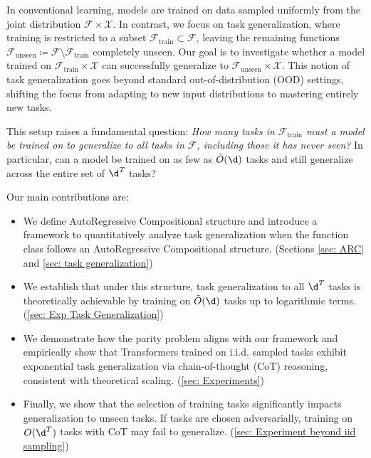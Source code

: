 In conventional learning, models are trained on data sampled uniformly from the joint distribution \(\mathcal{F} \times \mathcal{X}\). In contrast, we focus on task generalization, where training is restricted to a subset \(\mathcal{F}_{\mathrm{train}} \subset \mathcal{F}\), leaving the remaining functions \(\mathcal{F}_{\mathrm{unseen}} \coloneqq \mathcal{F} \setminus \mathcal{F}_{\mathrm{train}}\) completely unseen. Our goal is to investigate whether a model trained on \(\mathcal{F}_{\mathrm{train}} \times \mathcal{X}\) can successfully generalize to \(\mathcal{F}_{\mathrm{unseen}} \times \mathcal{X}\). This notion of task generalization goes beyond standard out-of-distribution (OOD) settings, shifting the focus from adapting to new input distributions to mastering entirely new tasks.



This setup raises a fundamental question:  
\textit{How many tasks in \(\mathcal{F}_{\mathrm{train}}\) must a model be trained on to generalize to all tasks in \(\mathcal{F}\), including those it has never seen?} In particular, can a model be trained on as few as \( \tilde{O}(\d) \) tasks and still generalize across the entire set of \( \d^T \) tasks?


Our main contributions are:
\vspace{-3mm}
\begin{itemize}[leftmargin=0.4 cm]
    \item We define AutoRegressive Compositional structure and introduce a framework to quantitatively analyze task generalization when the function class follows an AutoRegressive Compositional structure. (Sections \ref{sec: ARC} and \ref{sec: task generalization})
    
    \item We establish that under this structure, task generalization to all \( \d^T \) tasks is theoretically achievable by training on  \( \tilde{O}(\d) \) tasks up to logarithmic terms. (\cref{sec: Exp Task Generalization})
    
    \item We demonstrate how the parity problem aligns with our framework and empirically show that Transformers trained on i.i.d. sampled tasks exhibit exponential task generalization via chain-of-thought (CoT) reasoning, consistent with theoretical scaling. (\cref{sec: Experiments})
    
    \item Finally, we show that the selection of training tasks significantly impacts generalization to unseen tasks. If tasks are chosen adversarially, training on \( O(\d^T) \) tasks with CoT may fail to generalize. (\cref{sec: Experiment beyond iid sampling})\vspace{-3mm}
\end{itemize}


